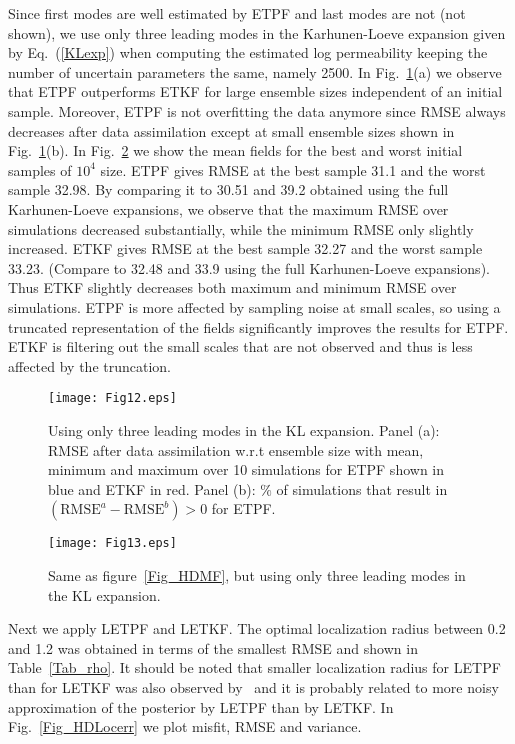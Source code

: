 \documentclass[12, a4paper]{article}
\numberwithin{equation}{section}
\begin{document}
Since first modes are well estimated by ETPF and last modes are not (not shown), 
we use only three leading modes in the Karhunen-Loeve expansion given by Eq.~(\ref{KLexp}) when computing the estimated log permeability 
keeping the number of uncertain parameters the same, namely 2500. In Fig.~\ref{Fig_HDLMerr}(a) we observe that ETPF outperforms ETKF for large ensemble sizes independent of an initial sample. Moreover, ETPF is not overfitting the data anymore since RMSE always decreases after data assimilation except at small ensemble sizes shown in Fig.~\ref{Fig_HDLMerr}(b). In Fig.~\ref{Fig_HDLMMF} we show the mean fields for the best and worst initial samples of $10^4$ size. ETPF gives RMSE at the best sample 31.1 and  the worst sample 32.98. By comparing it to 30.51 and 39.2 obtained using the full Karhunen-Loeve expansions, we observe that the maximum RMSE over simulations decreased substantially, while the minimum RMSE only slightly increased.   
ETKF gives RMSE at the best sample 32.27 and the worst sample 33.23. (Compare to 32.48 and 33.9 using the full Karhunen-Loeve expansions). 
Thus ETKF slightly decreases both maximum and minimum RMSE over simulations. 
ETPF is more affected by sampling noise at small scales, 
so using a truncated representation of the fields significantly improves the results for ETPF. 
ETKF is filtering out the small scales that are not observed and thus is less affected by the truncation.

\begin{figure} [t]
	\centering		
	\texttt{[image: Fig12.eps]}	
	\caption{Using only three leading modes in the KL expansion. Panel (a): RMSE after data assimilation w.r.t ensemble size with mean, minimum and maximum over 10 simulations for ETPF shown in blue and ETKF in red. Panel (b): $\%$ of simulations that result in $(\text{RMSE}^{a}-\text{RMSE}^{b})>0$ for ETPF.}	
	\label{Fig_HDLMerr}
\end{figure}  

\begin{figure} [t]
	\centering		
	\texttt{[image: Fig13.eps]}	
	\caption{Same as figure~\ref{Fig_HDMF}, but using only three leading modes in the KL expansion.}	\label{Fig_HDLMMF}
\end{figure}  

Next we apply LETPF and LETKF. The optimal localization radius between 0.2 and 1.2 was obtained in terms of the smallest RMSE and shown in Table~\ref{Tab_rho}.
It should be noted that smaller localization radius for LETPF than for LETKF was also observed by~\cite{ChRe15} 
and it is probably related to more noisy approximation of the posterior by LETPF than by LETKF. In Fig.~\ref{Fig_HDLocerr} we plot misfit, RMSE and variance. 
\end{document}

